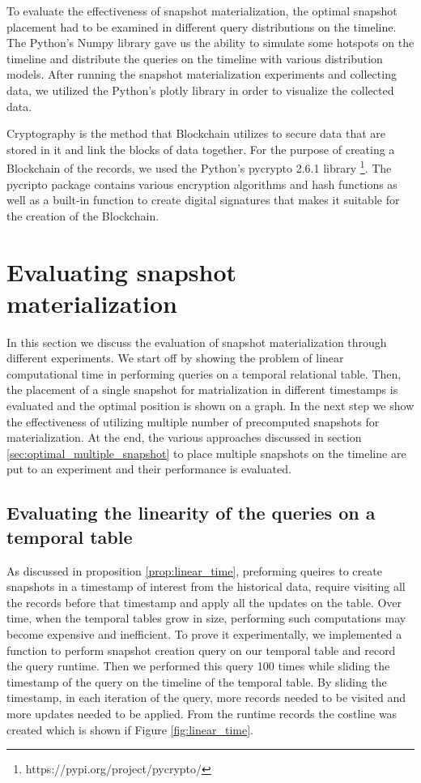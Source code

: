 		To evaluate the effectiveness of snapshot materialization, the optimal snapshot placement had to be examined in different query distributions on the timeline. The Python's Numpy library gave us the ability to simulate some hotspots on the timeline and distribute the queries on the timeline with various distribution models. After running the snapshot materialization experiments and collecting data, we utilized the Python's plotly library in order to visualize the collected data.

		Cryptography is the method that Blockchain utilizes to secure data that are stored in it and link the blocks of data together. For the purpose of creating a Blockchain of the records, we used the Python's pycrypto 2.6.1 library \footnote{https://pypi.org/project/pycrypto/}. The pycripto package contains various encryption algorithms and hash functions as well as a built-in function to create digital signatures that makes it suitable for the creation of the Blockchain.

	\section{Evaluating snapshot materialization} \label{sec:evaluation_of_snapshot_materialization}
		In this section we discuss the evaluation of snapshot materialization through different experiments. We start off by showing the problem of linear computational time in performing queries on a temporal relational table. Then, the placement of a single snapshot for matrialization in different timestamps is evaluated and the optimal position is shown on a graph. In the next step we show the effectiveness of utilizing multiple number of precomputed snapshots for materialization. At the end, the various approaches discussed in section \ref{sec:optimal_multiple_snapshot} to place multiple snapshots on the timeline are put to an experiment and their performance is evaluated.

		\subsection{Evaluating the linearity of the queries on a temporal table} \label{sec:evaluating_linearity}
			As discussed in proposition \ref{prop:linear_time}, preforming queires to create snapshots in a timestamp of interest from the historical data, require visiting all the records before that timestamp and apply all the updates on the table. Over time, when the temporal tables grow in size, performing such computations may become expensive and inefficient. To prove it experimentally, we implemented a function to perform snapshot creation query on our temporal table and record the query runtime. Then we performed this query 100 times while sliding the timestamp of the query on the timeline of the temporal table. By sliding the timestamp, in each iteration of the query, more records needed to be visited and more updates needed to be applied. From the runtime records the costline was created which is shown if Figure \ref{fig:linear_time}. 

